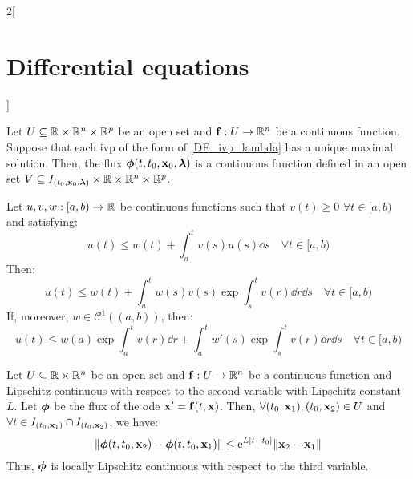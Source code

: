 \documentclass[../../../main.tex]{subfiles}
\begin{document}
\begin{multicols}{2}[\section{Differential equations}]
\begin{theorem}
    Let $U\subseteq\mathbb{R}\times\mathbb{R}^n\times\mathbb{R}^p$ be an open set and $\boldsymbol{\mathrm{f}}:U\rightarrow\mathbb{R}^n$ be a continuous function. Suppose that each ivp of the form of \cref{DE_ivp_lambda} has a unique maximal solution. Then, the flux $\boldsymbol{\mathrm{\phi}}(t,t_0,\boldsymbol{\mathrm{x}}_0,\boldsymbol{\mathrm{\lambda}})$ is a continuous function defined in an open set $V\subseteq I_{(t_0,\boldsymbol{\mathrm{x}}_0,\boldsymbol{\mathrm{\lambda}})}\times\mathbb{R}\times\mathbb{R}^n\times\mathbb{R}^p$.
  \end{theorem}
  \begin{lemma}
    Let $u,v,w:[a,b)\rightarrow\mathbb{R}$ be continuous functions such that $v(t)\geq 0$ $\forall t\in[a,b)$ and satisfying: $$u(t)\leq w(t)+\int_a^tv(s)u(s)\dd s\quad\forall t\in[a,b)$$
    Then: $$u(t)\leq w(t)+\int_a^tw(s)v(s)\exp{\int_s^tv(r)\dd r}\dd s\quad\forall t\in[a,b)$$
    If, moreover, $w\in\mathcal{C}^1((a,b))$, then: $$u(t)\leq w(a)\exp{\int_a^tv(r)\dd r}+\int_a^tw'(s)\exp{\int_s^tv(r)\dd r}\dd s\quad\forall t\in[a,b)$$
  \end{lemma}
  \begin{prop}
    Let $U\subseteq\mathbb{R}\times\mathbb{R}^n$ be an open set and $\boldsymbol{\mathrm{f}}:U\rightarrow\mathbb{R}^n$ be a continuous function and Lipschitz continuous with respect to the second variable with Lipschitz constant $L$. Let $\boldsymbol{\mathrm{\phi}}$ be the flux of the ode $\boldsymbol{\mathrm{x}}'=\boldsymbol{\mathrm{f}}(t,\boldsymbol{\mathrm{x}})$. Then, $\forall (t_0,\boldsymbol{\mathrm{x}}_1),(t_0,\boldsymbol{\mathrm{x}}_2)\in U$ and $\forall t\in I_{(t_0,\boldsymbol{\mathrm{x}}_1)}\cap I_{(t_0,\boldsymbol{\mathrm{x}}_2)}$, we have:
    $$\|\boldsymbol{\mathrm{\phi}}(t,t_0,\boldsymbol{\mathrm{x}}_2)-\boldsymbol{\mathrm{\phi}}(t,t_0,\boldsymbol{\mathrm{x}}_1)\|\leq\mathrm{e}^{L|t-t_0|}\|\boldsymbol{\mathrm{x}}_2-\boldsymbol{\mathrm{x}}_1\|$$
    Thus, $\boldsymbol{\mathrm{\phi}}$ is locally Lipschitz continuous with respect to the third variable.
  \end{prop}

\end{multicols}
\end{document}
